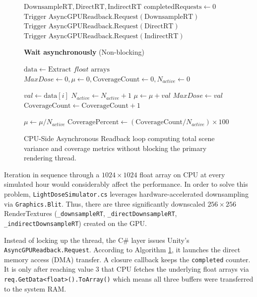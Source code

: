 \begin{figure}[H]
    \begin{algorithmic}
        \Require $\text{DownsampleRT}, \text{DirectRT}, \text{IndirectRT}$
        \State $\text{completedRequests} \leftarrow 0$
        \State $\text{Trigger AsyncGPUReadback.Request}(\text{DownsampleRT})$
        \State $\text{Trigger AsyncGPUReadback.Request}(\text{DirectRT})$
        \State $\text{Trigger AsyncGPUReadback.Request}(\text{IndirectRT})$

        \State \textbf{Wait asynchronously} (Non-blocking)
        \EndWhile

        \State $\text{data} \leftarrow \text{Extract } float \text{ arrays}$
        \State $MaxDose \leftarrow 0, \mu \leftarrow 0, \text{CoverageCount} \leftarrow 0, N_{active} \leftarrow 0$

         \quad {}
        \State $val \leftarrow \text{data}[i]$
        \State $N_{active} \leftarrow N_{active} + 1$
        \State $\mu \leftarrow \mu + val$
         $MaxDose \leftarrow val$ \EndIf
         $\text{CoverageCount} \leftarrow \text{CoverageCount} + 1$ \EndIf
        \EndIf
        \EndFor

        \State $\mu \leftarrow \mu / N_{active}$
        \State $\text{CoveragePercent} \leftarrow (\text{CoverageCount} / N_{active}) \times 100$
    \end{algorithmic}
    \caption{CPU-Side Asynchronous Readback loop computing total scene variance and coverage metrics without blocking the primary rendering thread.}
    \label{alg:async_readback}
\end{figure}

Iteration in sequence through a $1024 \times 1024$ float array on CPU at every simulated hour would considerably affect the performance. In order to solve this problem, \texttt{LightDoseSimulator.cs} leverages hardware-accelerated downsampling via \texttt{Graphics.Blit}. Thus, there are three significantly downscaled $256 \times 256$ RenderTextures (\texttt{\_downsampleRT}, \texttt{\_directDownsampleRT}, \texttt{\_indirectDownsampleRT}) created on the GPU.

Instead of locking up the thread, the C\# layer issues Unity’s \texttt{AsyncGPUReadback.Request}. According to Algorithm \ref{alg:async_readback}, it launches the direct memory access (DMA) transfer. A closure callback keeps the \texttt{completed} counter. It is only after reaching value 3 that CPU fetches the underlying float arrays via \texttt{req.GetData<float>().ToArray()} which means all three buffers were transferred to the system RAM.

